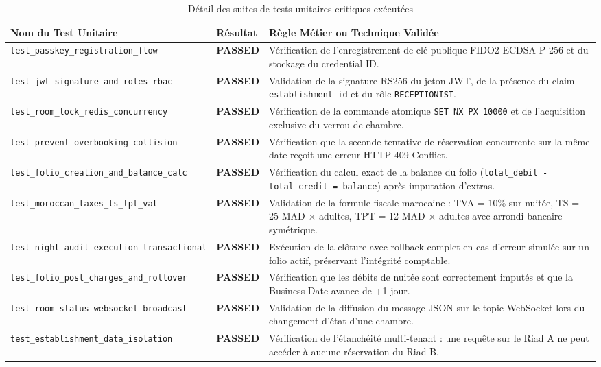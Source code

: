 \begin{table}[H]
\centering
\small
\renewcommand{\arraystretch}{1.3}
\begin{tabularx}{\textwidth}{|p{4.2cm}|p{2.2cm}|X|}
\hline
\textbf{Nom du Test Unitaire} & \textbf{Résultat} & \textbf{Règle Métier ou Technique Validée} \\
\hline
\texttt{test\_passkey\_registration\_flow} & \textbf{PASSED} & Vérification de l'enregistrement de clé publique FIDO2 ECDSA P-256 et du stockage du credential ID. \\
\hline
\texttt{test\_jwt\_signature\_and\_roles\_rbac} & \textbf{PASSED} & Validation de la signature RS256 du jeton JWT, de la présence du claim \texttt{establishment\_id} et du rôle \texttt{RECEPTIONIST}. \\
\hline
\texttt{test\_room\_lock\_redis\_concurrency} & \textbf{PASSED} & Vérification de la commande atomique \texttt{SET NX PX 10000} et de l'acquisition exclusive du verrou de chambre. \\
\hline
\texttt{test\_prevent\_overbooking\_collision} & \textbf{PASSED} & Vérification que la seconde tentative de réservation concurrente sur la même date reçoit une erreur HTTP 409 Conflict. \\
\hline
\texttt{test\_folio\_creation\_and\_balance\_calc} & \textbf{PASSED} & Vérification du calcul exact de la balance du folio (\texttt{total\_debit - total\_credit = balance}) après imputation d'extras. \\
\hline
\texttt{test\_moroccan\_taxes\_ts\_tpt\_vat} & \textbf{PASSED} & Validation de la formule fiscale marocaine : TVA = 10\% sur nuitée, TS = 25 MAD $\times$ adultes, TPT = 12 MAD $\times$ adultes avec arrondi bancaire symétrique. \\
\hline
\texttt{test\_night\_audit\_execution\_transactional} & \textbf{PASSED} & Exécution de la clôture avec rollback complet en cas d'erreur simulée sur un folio actif, préservant l'intégrité comptable. \\
\hline
\texttt{test\_folio\_post\_charges\_and\_rollover} & \textbf{PASSED} & Vérification que les débits de nuitée sont correctement imputés et que la Business Date avance de +1 jour. \\
\hline
\texttt{test\_room\_status\_websocket\_broadcast} & \textbf{PASSED} & Validation de la diffusion du message JSON sur le topic WebSocket lors du changement d'état d'une chambre. \\
\hline
\texttt{test\_establishment\_data\_isolation} & \textbf{PASSED} & Vérification de l'étanchéité multi-tenant : une requête sur le Riad A ne peut accéder à aucune réservation du Riad B. \\
\hline
\end{tabularx}
\caption{Détail des suites de tests unitaires critiques exécutées}
\label{tab:cas_tests_unitaires}
\end{table}

